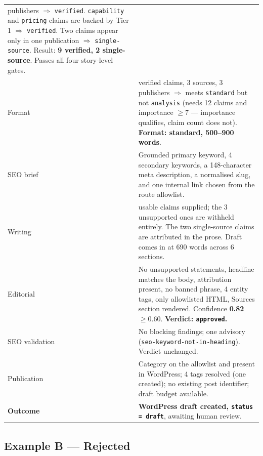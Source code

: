 \documentclass[11pt,a4paper]{article}
\newcommand{\brk}{\hyphenpenalty=0\exhyphenpenalty=0\relax}
\newcommand{\code}[1]{\texttt{\small\brk #1}}
\begin{document}
\begin{center}
\begin{tabularx}{\textwidth}{@{}p{3.9cm} >{\RaggedRight}X@{}}
  publishers $\Rightarrow$ \code{verified}. \code{capability} and \code{pricing}
  claims are backed by Tier 1 $\Rightarrow$ \code{verified}. Two claims appear only
  in one publication $\Rightarrow$ \code{single-source}. Result: \textbf{9 verified,
  2 single-source}. Passes all four story-level gates. \\
Format & 9 verified claims, 3 sources, 3 publishers $\Rightarrow$ meets
  \code{standard} but not \code{analysis} (needs 12 claims and importance $\geq 7$
  --- importance qualifies, claim count does not). \textbf{Format: standard,
  500--900 words}. \\
SEO brief & Grounded primary keyword, 4 secondary keywords, a 148-character meta
  description, a normalised slug, and one internal link chosen from the route
  allowlist. \\
Writing & 11 usable claims supplied; the 3 unsupported ones are withheld entirely.
  The two single-source claims are attributed in the prose. Draft comes in at 690
  words across 6 sections. \\
Editorial & No unsupported statements, headline matches the body, attribution
  present, no banned phrase, 4 entity tags, only allowlisted HTML, Sources section
  rendered. Confidence \textbf{0.82} $\geq 0.60$. \textbf{Verdict:
  \code{approved}.} \\
SEO validation & No blocking findings; one advisory
  (\code{seo-keyword-not-in-heading}). Verdict unchanged. \\
Publication & Category on the allowlist and present in WordPress; 4 tags resolved
  (one created); no existing post identifier; draft budget available. \\
\midrule
\textbf{Outcome} & \textcolor{aitkGo}{\textbf{WordPress draft created,
  \code{status = draft}}}, awaiting human review. \\
\bottomrule
\end{tabularx}
\end{center}

\subsection{Example B --- Rejected}
\end{document}
